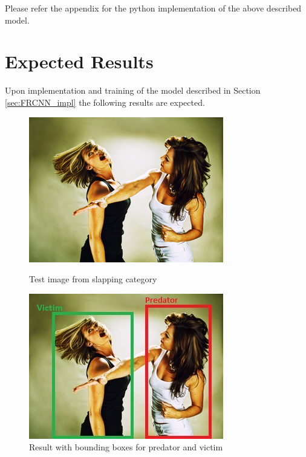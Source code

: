 \documentclass[12pt]{article}
\begin{document}
Please refer the appendix for the python implementation of the above described model. 
\newpage

\section{Expected Results}
Upon implementation and training of the model described in Section \ref{sec:FRCNN_impl} the following results are expected. 

\begin{figure}[H]
  \centering
  \begin{minipage}[b]{0.4\textwidth}
    \includegraphics[width=\textwidth]{./Images/Result1.jpeg}
    \caption{Test image from slapping category }
    \label{fig:result1}
  \end{minipage}
  \hfill
  \begin{minipage}[b]{0.4\textwidth}
    \includegraphics[width=\textwidth]{./Images/Result1_Bbox.jpeg}
    \caption{Result with bounding boxes for predator and victim}
    \label{fig:result1bbox}
  \end{minipage}
\end{figure}
\end{document}
